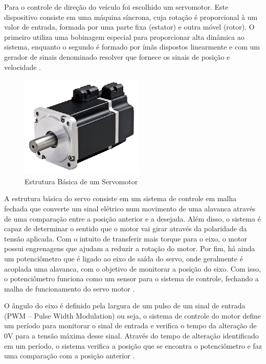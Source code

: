 \begin{itemize}
       Para o controle de direção do veículo foi escolhido um servomotor. Este dispositivo consiste em uma máquina síncrona, cuja rotação é proporcional à um valor de entrada, formada por uma parte fixa (estator) e outra móvel (rotor). O primeiro utiliza uma bobinagem especial para proporcionar alta dinâmica ao sistema, enquanto o segundo é formado por ímãs dispostos linearmente e com um gerador de sinais denominado resolver que fornece os sinais de posição e velocidade \cite{ottoboni}.
       
              \begin{figure}[!htbp]
              	\begin{center}
              		\includegraphics[keepaspectratio=true,scale=1]{figuras/servo1.eps}
              		\caption{Estrutura Básica de um Servomotor}
              	\end{center}
              \end{figure}

A estrutura básica do servo consiste em um sistema de controle em malha fechada que converte um sinal elétrico num movimento de uma alavanca através de uma comparação entre a posição anterior e a desejada. Além disso, o sistema é capaz de determinar o sentido que o motor vai girar através da polaridade da tensão aplicada. Com o intuito de transferir mais torque para o eixo, o motor possui engrenagens que ajudam a reduzir a rotação do motor. Por fim, há ainda um potenciômetro que é ligado ao eixo de saída do servo, onde geralmente é acoplada uma alavanca, com o objetivo de monitorar a posição do eixo. Com isso, o potenciômetro funciona como um sensor para o sistema de controle, fechando a malha de funcionamento do servo motor \cite{ncb}.

O ângulo do eixo é definido pela largura de um pulso de um sinal de entrada (PWM – Pulse Width Modulation) ou seja, o sistema de controle do motor define um período para monitorar o sinal de entrada e verifica o tempo da alteração de 0V para a tensão máxima desse sinal. Através do tempo de alteração identificado em um período, o sistema verifica a posição que se encontra o potenciômetro e faz uma comparação com a posição anterior \cite{santos}.


\end{itemize}
